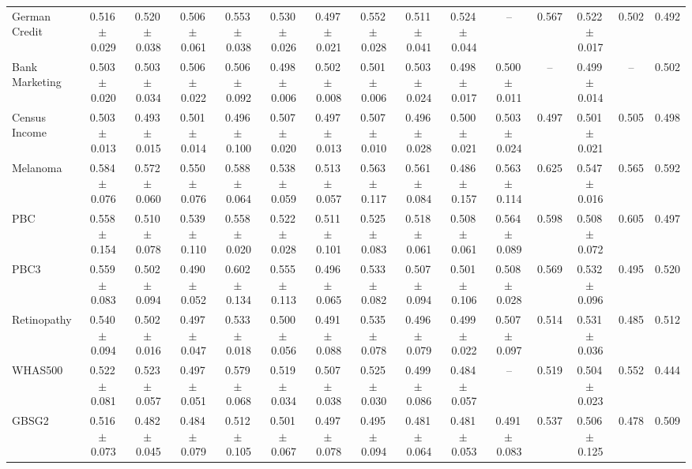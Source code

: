 \documentclass[8pt]{extarticle}
\begin{document}
\begin{longtable}{l*{14}{c}}
German Credit & 0.516\,$\pm$\,0.029 & 0.520\,$\pm$\,0.038 & 0.506\,$\pm$\,0.061 & 0.553\,$\pm$\,0.038 & 0.530\,$\pm$\,0.026 & 0.497\,$\pm$\,0.021 & 0.552\,$\pm$\,0.028 & 0.511\,$\pm$\,0.041 & 0.524\,$\pm$\,0.044 & -- & 0.567 & 0.522\,$\pm$\,0.017 & 0.502 & 0.492 \\
Bank Marketing & 0.503\,$\pm$\,0.020 & 0.503\,$\pm$\,0.034 & 0.506\,$\pm$\,0.022 & 0.506\,$\pm$\,0.092 & 0.498\,$\pm$\,0.006 & 0.502\,$\pm$\,0.008 & 0.501\,$\pm$\,0.006 & 0.503\,$\pm$\,0.024 & 0.498\,$\pm$\,0.017 & 0.500\,$\pm$\,0.011 & -- & 0.499\,$\pm$\,0.014 & -- & 0.502 \\
Census Income & 0.503\,$\pm$\,0.013 & 0.493\,$\pm$\,0.015 & 0.501\,$\pm$\,0.014 & 0.496\,$\pm$\,0.100 & 0.507\,$\pm$\,0.020 & 0.497\,$\pm$\,0.013 & 0.507\,$\pm$\,0.010 & 0.496\,$\pm$\,0.028 & 0.500\,$\pm$\,0.021 & 0.503\,$\pm$\,0.024 & 0.497 & 0.501\,$\pm$\,0.021 & 0.505 & 0.498 \\
Melanoma & 0.584\,$\pm$\,0.076 & 0.572\,$\pm$\,0.060 & 0.550\,$\pm$\,0.076 & 0.588\,$\pm$\,0.064 & 0.538\,$\pm$\,0.059 & 0.513\,$\pm$\,0.057 & 0.563\,$\pm$\,0.117 & 0.561\,$\pm$\,0.084 & 0.486\,$\pm$\,0.157 & 0.563\,$\pm$\,0.114 & 0.625 & 0.547\,$\pm$\,0.016 & 0.565 & 0.592 \\
PBC & 0.558\,$\pm$\,0.154 & 0.510\,$\pm$\,0.078 & 0.539\,$\pm$\,0.110 & 0.558\,$\pm$\,0.020 & 0.522\,$\pm$\,0.028 & 0.511\,$\pm$\,0.101 & 0.525\,$\pm$\,0.083 & 0.518\,$\pm$\,0.061 & 0.508\,$\pm$\,0.061 & 0.564\,$\pm$\,0.089 & 0.598 & 0.508\,$\pm$\,0.072 & 0.605 & 0.497 \\
PBC3 & 0.559\,$\pm$\,0.083 & 0.502\,$\pm$\,0.094 & 0.490\,$\pm$\,0.052 & 0.602\,$\pm$\,0.134 & 0.555\,$\pm$\,0.113 & 0.496\,$\pm$\,0.065 & 0.533\,$\pm$\,0.082 & 0.507\,$\pm$\,0.094 & 0.501\,$\pm$\,0.106 & 0.508\,$\pm$\,0.028 & 0.569 & 0.532\,$\pm$\,0.096 & 0.495 & 0.520 \\
Retinopathy & 0.540\,$\pm$\,0.094 & 0.502\,$\pm$\,0.016 & 0.497\,$\pm$\,0.047 & 0.533\,$\pm$\,0.018 & 0.500\,$\pm$\,0.056 & 0.491\,$\pm$\,0.088 & 0.535\,$\pm$\,0.078 & 0.496\,$\pm$\,0.079 & 0.499\,$\pm$\,0.022 & 0.507\,$\pm$\,0.097 & 0.514 & 0.531\,$\pm$\,0.036 & 0.485 & 0.512 \\
WHAS500 & 0.522\,$\pm$\,0.081 & 0.523\,$\pm$\,0.057 & 0.497\,$\pm$\,0.051 & 0.579\,$\pm$\,0.068 & 0.519\,$\pm$\,0.034 & 0.507\,$\pm$\,0.038 & 0.525\,$\pm$\,0.030 & 0.499\,$\pm$\,0.086 & 0.484\,$\pm$\,0.057 & -- & 0.519 & 0.504\,$\pm$\,0.023 & 0.552 & 0.444 \\
GBSG2 & 0.516\,$\pm$\,0.073 & 0.482\,$\pm$\,0.045 & 0.484\,$\pm$\,0.079 & 0.512\,$\pm$\,0.105 & 0.501\,$\pm$\,0.067 & 0.497\,$\pm$\,0.078 & 0.495\,$\pm$\,0.094 & 0.481\,$\pm$\,0.064 & 0.481\,$\pm$\,0.053 & 0.491\,$\pm$\,0.083 & 0.537 & 0.506\,$\pm$\,0.125 & 0.478 & 0.509 \\

\end{longtable}
\end{document}
